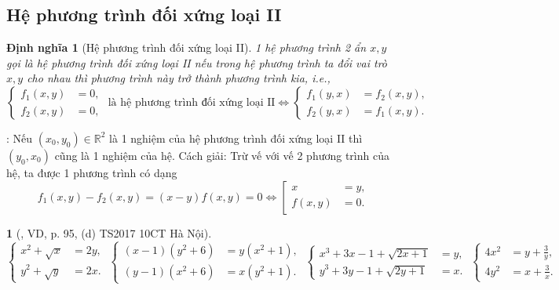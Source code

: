 \documentclass{article}
\newtheorem{baitoan}{}
\newtheorem{dinhnghia}{Định nghĩa}
\begin{document}
\subsection{Hệ phương trình đối xứng loại II}

\begin{dinhnghia}[Hệ phương trình đối xứng loại II]
	1 hệ phương trình 2 ẩn $x,y$ gọi là {hệ phương trình đối xứng loại II} nếu trong hệ phương trình ta đổi vai trò $x,y$ cho nhau thì phương trình này trở thành phương trình kia, i.e.,
	\begin{equation*}
		\left\{\begin{split}
			f_1(x,y) &= 0,\\
			f_2(x,y) &= 0,
		\end{split}\right.\mbox{ là hệ phương trình đối xứng loại II}\Leftrightarrow\left\{\begin{split}
			f_1(y,x) &= f_2(x,y),\\
			f_2(y,x) &= f_1(x,y).
		\end{split}\right.
	\end{equation*}
\end{dinhnghia}
: Nếu $(x_0,y_0)\in\mathbb{R}^2$ là 1 nghiệm của hệ phương trình đối xứng loại II thì $(y_0,x_0)$ cũng là 1 nghiệm của hệ. {\sf Cách giải}: Trừ vế với vế 2 phương trình của hệ, ta được 1 phương trình có dạng
\begin{equation*}
	f_1(x,y) - f_2(x,y) = (x - y)f(x,y) = 0\Leftrightarrow\left[\begin{split}
		x &= y,\\
		f(x,y) &= 0.
	\end{split}\right.
\end{equation*}

\begin{baitoan}[\cite{Kien_dai_so_9}, VD, p. 95, (d) TS2017 10CT Hà Nội]
	\begin{equation*}
		\left\{\begin{split}
			x^2 + \sqrt{x} &= 2y,\\
			y^2 + \sqrt{y} &= 2x.
		\end{split}\right.\ \left\{\begin{split}
			(x - 1)(y^2 + 6) &= y(x^2 + 1),\\
			(y - 1)(x^2 + 6) &= x(y^2 + 1).
		\end{split}\right.\ \left\{\begin{split}
			x^3 + 3x - 1 + \sqrt{2x + 1} &= y,\\
			y^3 + 3y - 1 + \sqrt{2y + 1} &= x.
		\end{split}\right.\ \left\{\begin{split}
			4x^2 &= y + \frac{3}{y},\\
			4y^2 &= x + \frac{3}{x}.
		\end{split}\right.
	\end{equation*}
\end{baitoan}
\end{document}
